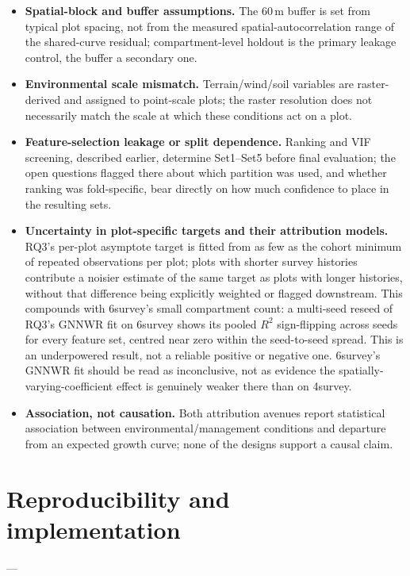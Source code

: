 \documentclass[11pt,a4paper]{report}
\begin{document}
\begin{itemize}
\setlength\itemsep{0pt}
\item \textbf{Spatial-block and buffer assumptions.} The 60\,m buffer is set from typical plot
  spacing, not from the measured spatial-autocorrelation range of the shared-curve residual;
  compartment-level holdout is the primary leakage control, the buffer a
  secondary one.
\item \textbf{Environmental scale mismatch.} Terrain/wind/soil variables are raster-derived and
  assigned to point-scale plots; the raster resolution does not necessarily match the scale at
  which these conditions act on a plot.
\item \textbf{Feature-selection leakage or split dependence.} Ranking and VIF screening, described
  earlier, determine Set1--Set5 before final evaluation; the open questions
  flagged there about which partition was used, and whether ranking was fold-specific, bear
  directly on how much confidence to place in the resulting sets.
\item \textbf{Uncertainty in plot-specific targets and their attribution models.} RQ3's per-plot
  asymptote target is fitted from as few as the cohort minimum of repeated
  observations per plot; plots with shorter survey histories contribute a noisier estimate of the
  same target as plots with longer histories, without that difference being explicitly weighted or
  flagged downstream. This compounds with 6survey's small compartment count: a multi-seed reseed
  of RQ3's GNNWR fit on 6survey shows its pooled $R^2$ sign-flipping across seeds for every feature
  set, centred near zero within the seed-to-seed spread. This is an underpowered result, not a
  reliable positive or negative one. 6survey's GNNWR fit should be read as inconclusive, not as
  evidence the spatially-varying-coefficient effect is genuinely weaker there than on 4survey.
\item \textbf{Association, not causation.} Both attribution avenues report statistical association
  between environmental/management conditions and departure from
  an expected growth curve; none of the designs support a causal claim.
\end{itemize}

\section{Reproducibility and implementation}
--- 
\end{document}
